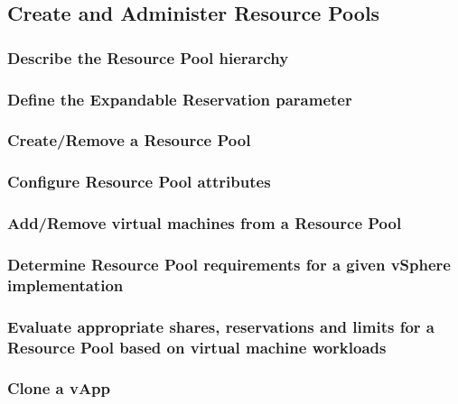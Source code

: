 \subsection{Create and Administer Resource Pools}

\subsubsection{Describe the Resource Pool hierarchy}

\subsubsection{Define the Expandable Reservation parameter}

\subsubsection{Create/Remove a Resource Pool}

\subsubsection{Configure Resource Pool attributes}

\subsubsection{Add/Remove virtual machines from a Resource Pool}

\subsubsection{Determine Resource Pool requirements for a given vSphere implementation}

\subsubsection{Evaluate appropriate shares, reservations and limits for a Resource Pool based on virtual machine workloads}

\subsubsection{Clone a vApp}
